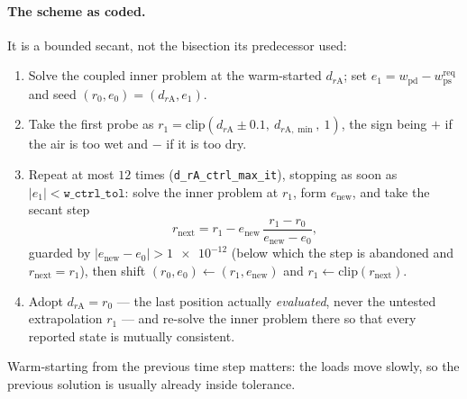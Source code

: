 \documentclass[11pt]{article}
\begin{document}
\paragraph{The scheme as coded.} It is a bounded secant, not the bisection its
predecessor used:
\begin{enumerate}[nosep]
\item Solve the coupled inner problem at the warm-started
      $d_{r\mathrm{A}}$; set $e_1 = w_{\mathrm{pd}}-w_{\mathrm{ps}}^{\mathrm{req}}$
      and seed $(r_0,e_0)=(d_{r\mathrm{A}},e_1)$.
\item Take the first probe as $r_1 = \mathrm{clip}\!\left(d_{r\mathrm{A}}
      \pm \num{0.1},\ d_{r\mathrm{A},\min},\ 1\right)$, the sign being
      $+$ if the air is too wet and $-$ if it is too dry.
\item Repeat at most $\num{12}$ times (\texttt{d\_rA\_ctrl\_max\_it}),
      stopping as soon as $|e_1| < \texttt{w\_ctrl\_tol}$: solve the inner
      problem at $r_1$, form $e_{\mathrm{new}}$, and take the secant step
      \begin{equation}
      r_{\mathrm{next}} = r_1 - e_{\mathrm{new}}\,
      \frac{r_1-r_0}{e_{\mathrm{new}}-e_0},
      \label{eq:air:secant}
      \end{equation}
      guarded by $|e_{\mathrm{new}}-e_0|>\num{1e-12}$ (below which the step is
      abandoned and $r_{\mathrm{next}}=r_1$), then shift
      $(r_0,e_0)\leftarrow(r_1,e_{\mathrm{new}})$ and
      $r_1\leftarrow\mathrm{clip}(r_{\mathrm{next}})$.
\item Adopt $d_{r\mathrm{A}}=r_0$ --- the last position actually
      \emph{evaluated}, never the untested extrapolation $r_1$ --- and re-solve
      the inner problem there so that every reported state is mutually
      consistent.
\end{enumerate}
Warm-starting from the previous time step matters: the loads move slowly, so
the previous solution is usually already inside tolerance.
\end{document}
